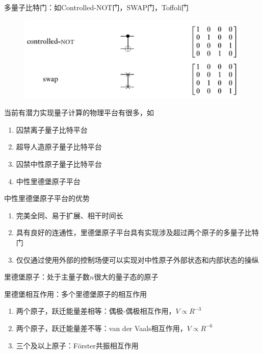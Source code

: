 \documentclass[fontset=windows,toc=true,type=bachelor,stage=opening,campus=weihai]{hithesisart}
\begin{document}
多量子比特门：如Controlled-NOT门，SWAP门，Toffoli门
\begin{figure}
\centering
\includegraphics[scale=0.25]{gaten}
\label{fig:gaten}
\end{figure}


当前有潜力实现量子计算的物理平台有很多，如
\begin{enumerate}
\item 囚禁离子量子比特平台
\item 超导人造原子量子比特平台
\item 囚禁中性原子量子比特平台
\item 中性里德堡原子平台
\end{enumerate}
中性里德堡原子平台的优势
\begin{enumerate}
\item 完美全同、易于扩展、相干时间长
\item 具有良好的连通性，里德堡原子平台具有实现涉及超过两个原子的多量子比特门
\item 仅仅通过使用外部的控制场便可以实现对中性原子外部状态和内部状态的操纵
\end{enumerate}


里德堡原子：处于主量子数$ n $很大的量子态的原子

里德堡相互作用：多个里德堡原子的相互作用
\begin{enumerate}
\item 两个原子，跃迁能量差相等：偶极-偶极相互作用，$ V\propto R^{-3} $
\item 两个原子，跃迁能量差不等：van der Vaals相互作用，$ V\propto R^{-6} $
\item 三个及以上原子：F\"orster共振相互作用
\end{enumerate}
\end{document}
